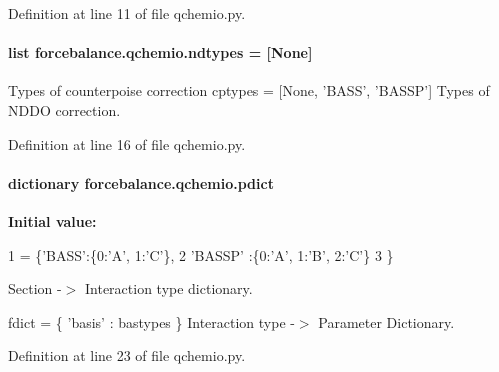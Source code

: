 Definition at line 11 of file qchemio.\-py.

\hypertarget{namespaceforcebalance_1_1qchemio_a5c04a6c864770abe6ba25d3e6a5a8119}{
\paragraph[{ndtypes}]{\setlength{\rightskip}{0pt plus 5cm}list forcebalance.\-qchemio.\-ndtypes = \mbox{[}None\mbox{]}}}\label{namespaceforcebalance_1_1qchemio_a5c04a6c864770abe6ba25d3e6a5a8119}


Types of counterpoise correction cptypes = \mbox{[}None, 'B\-A\-S\-S', 'B\-A\-S\-S\-P'\mbox{]} Types of N\-D\-D\-O correction. 



Definition at line 16 of file qchemio.\-py.

\hypertarget{namespaceforcebalance_1_1qchemio_ad9040be76e063b08b49a26ca12295a18}{
\paragraph[{pdict}]{\setlength{\rightskip}{0pt plus 5cm}dictionary forcebalance.\-qchemio.\-pdict}}\label{namespaceforcebalance_1_1qchemio_ad9040be76e063b08b49a26ca12295a18}
{\bfseries Initial value\-:}
\begin{DoxyCode}
1 = \{\textcolor{stringliteral}{'BASS'}:\{0:\textcolor{stringliteral}{'A'}, 1:\textcolor{stringliteral}{'C'}\},
2          \textcolor{stringliteral}{'BASSP'} :\{0:\textcolor{stringliteral}{'A'}, 1:\textcolor{stringliteral}{'B'}, 2:\textcolor{stringliteral}{'C'}\}
3          \}
\end{DoxyCode}


Section -\/$>$ Interaction type dictionary. 

fdict = \{ 'basis' \-: bastypes \} Interaction type -\/$>$ Parameter Dictionary. 

Definition at line 23 of file qchemio.\-py.

